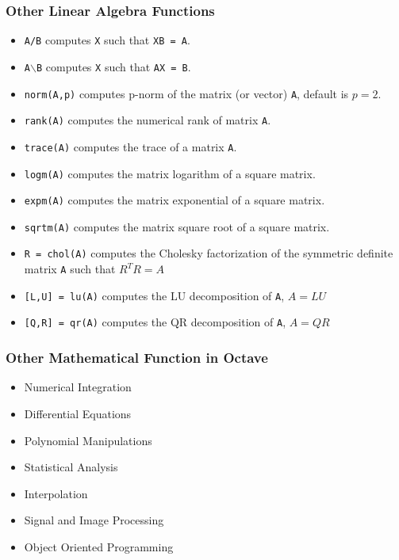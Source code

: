 \documentclass[slidestop,mathserif,compress,xcolor=svgnames]{beamer}
\begin{document}
\begin{frame}[allowframebreaks]
  \frametitle{\small Other Linear Algebra Functions}
  \begin{itemize}
    \item \texttt{A/B} computes \texttt{X} such that \texttt{XB = A}.
    \item \texttt{A$\backslash$B} computes \texttt{X} such that \texttt{AX = B}.
    \item \texttt{norm(A,p)} computes p-norm of the matrix (or vector) \texttt{A}, default is $p=2$.
    \item \texttt{rank(A)} computes the numerical rank of matrix \texttt{A}.
    \item \texttt{trace(A)} computes the trace of a matrix \texttt{A}.
    \item \texttt{logm(A)} computes the matrix logarithm of a square matrix.
    \item \texttt{expm(A)} computes the matrix exponential of a square matrix.
    \item \texttt{sqrtm(A)} computes the matrix square root of a square matrix.
    \item \texttt{R = chol(A)} computes the Cholesky factorization of the symmetric definite matrix \texttt{A} such that $R^TR =A$
    \item \texttt{[L,U] = lu(A)} computes the LU decomposition of \texttt{A}, $A = LU$
    \item \texttt{[Q,R] = qr(A)} computes the QR decomposition of \texttt{A}, $A = QR$
  \end{itemize}
\end{frame}

\begin{frame}
  \frametitle{\small Other Mathematical Function in Octave}
  \begin{itemize}
    \item Numerical Integration 
    \item Differential Equations
    \item Polynomial Manipulations
    \item Statistical Analysis
    \item Interpolation
    \item Signal and Image Processing
    \item Object Oriented Programming
  \end{itemize}
\end{frame}
\end{document}
